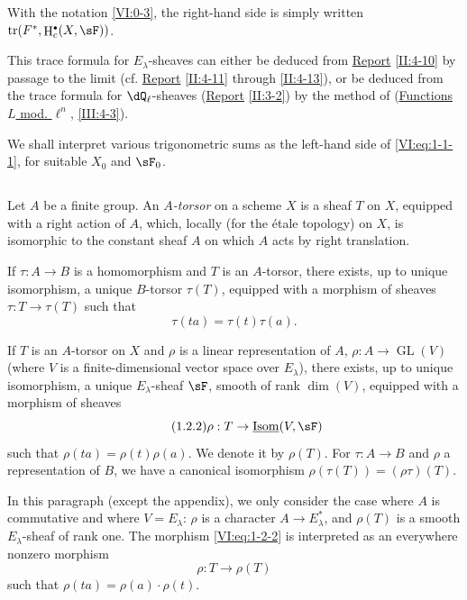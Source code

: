 \documentclass[oneside]{book}
\DeclareMathOperator{\gl}{GL}
\DeclareMathOperator{\h}{H}
\DeclareMathOperator{\tr}{tr}
\newcounter{char}
\theoremstyle{sga-source}
\theoremstyle{sga-source-dash}
\theoremstyle{sga-source-dotdash}
\theoremstyle{sga-source-number-note-dash}
\theoremstyle{sga-source-note-number-dotdash}
\theoremstyle{sga-source-example-dotdash}
\theoremstyle{sga-source-inline-number}
\theoremstyle{sga-source-bare-number}
\theoremstyle{sga-source}
\let\oldbullet\bullet
\renewcommand{\bullet}{\textnormal{\tiny$\oldbullet$}}
\newcommand{\PrintPage}[1]{}\newcommand{\MathPage}[1]{}\newcommand{\PrintCite}[2]{#1}\newcommand{\var}[3]{#1}
\begin{document}
With the notation \ref{VI:0-3}, the right-hand side is simply written 
$\tr(F^\ast,\h_c^\bullet(X,\sF))$. 

This trace formula for $E_\lambda$-sheaves can either be 
deduced from \hyperref[II]{Report} \ref{II:4-10} by passage to the limit (cf. 
\hyperref[II]{Report} \ref{II:4-11} through \ref{II:4-13}), or be deduced 
from the trace formula for $\dQ_\ell$-sheaves (\hyperref[II]{Report} 
\ref{II:3-2}) by the method of (\hyperref[III]{Functions $L$ mod. $\ell^n$}, 
\ref{III:4-3}). 

We shall interpret various trigonometric sums as the left-hand side of 
\eqref{VI:eq:1-1-1}, for suitable $X_0$ and $\sF_0$. 





\PrintPage{170}
\subsection{}\label{VI:1-2}

Let $A$ be a finite group. An \emph{$A$-torsor} on a scheme $X$ is a 
sheaf $T$ on $X$, equipped with a right action of $A$, which, locally 
(for the étale topology) on $X$, is isomorphic to the constant sheaf $A$ on 
which $A$ acts by right translation. 

If $\tau:A\to B$ is a homomorphism and $T$ is an $A$-torsor, there exists, 
up to unique isomorphism, a unique $B$-torsor $\tau(T)$, equipped with a 
morphism of sheaves $\tau:T\to \tau(T)$ such that 
\begin{equation*}\tag{1.2.1}\label{VI:eq:1-2-1}
  \tau(t a) = \tau(t) \tau(a)\text{.}
\end{equation*}

If $T$ is an $A$-torsor on $X$ and $\rho$ is a linear representation 
of $A$, $\rho:A\to \gl(V)$ (where $V$ is a finite-dimensional vector space over 
$E_\lambda$), there exists, up to unique isomorphism, a unique 
$E_\lambda$-sheaf $\sF$, smooth of rank $\dim(V)$, equipped with a morphism of 
sheaves 
\begin{equation*}\tag{1.2.2}\label{VI:eq:1-2-2}
  \rho:T\to \underline{\operatorname{Isom}}(V,\sF)
\end{equation*}
such that $\rho(t a) = \rho(t) \rho(a)$. We denote it by $\rho(T)$. For 
$\tau:A\to B$ and $\rho$ a representation of $B$, we have a canonical 
isomorphism $\rho(\tau(T)) = (\rho\tau)(T)$. 

In this paragraph (except the appendix), we only consider the case where $A$ 
is commutative and where $V=E_\lambda$: $\rho$ is a character 
$A\to E_\lambda^\ast$, and $\rho(T)$ is a smooth $E_\lambda$-sheaf of rank 
one. The morphism \eqref{VI:eq:1-2-2} is interpreted as an everywhere 
nonzero morphism 
\begin{equation*}\tag{1.2.3}\label{VI:eq:1-2-3}
  \rho:T\to \rho(T) 
\end{equation*}
such that $\rho(t a) = \rho(a)\cdot\rho(t)$. 
\end{document}
